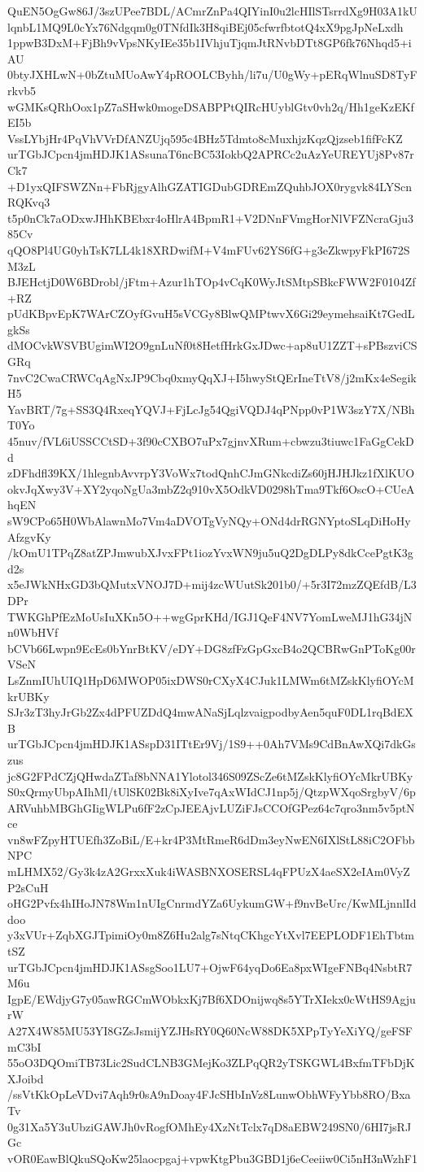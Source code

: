 QuEN5OgGw86J/3szUPee7BDL/ACmrZnPa4QIYinI0u2lcHIlSTsrrdXg9H03A1kU
lqnbL1MQ9L0cYx76Ndgqm0g0TNfdIk3H8qiBEj05cfwrfbtotQ4xX9pgJpNeLxdh
1ppwB3DxM+FjBh9vVpsNKyIEe35b1IVhjuTjqmJtRNvbDTt8GP6fk76Nhqd5+iAU
0btyJXHLwN+0bZtuMUoAwY4pROOLCByhh/li7u/U0gWy+pERqWlnuSD8TyFrkvb5
wGMKsQRhOox1pZ7aSHwk0mogeDSABPPtQIRcHUyblGtv0vh2q/Hh1geKzEKfEI5b
VssLYbjHr4PqVhVVrDfANZUjq595c4BHz5Tdmto8cMuxhjzKqzQjzseb1fifFcKZ
urTGbJCpcn4jmHDJK1ASsunaT6ncBC53IokbQ2APRCc2uAzYeUREYUj8Pv87rCk7
+D1yxQIFSWZNn+FbRjgyAlhGZATIGDubGDREmZQuhbJOX0rygvk84LYScnRQKvq3
t5p0nCk7aODxwJHhKBEbxr4oHlrA4BpmR1+V2DNnFVmgHorNlVFZNcraGju385Cv
qQO8Pl4UG0yhTsK7LL4k18XRDwifM+V4mFUv62YS6fG+g3eZkwpyFkPI672SM3zL
BJEHctjD0W6BDrobl/jFtm+Azur1hTOp4vCqK0WyJtSMtpSBkcFWW2F0104Zf+RZ
pUdKBpvEpK7WArCZOyfGvuH5sVCGy8BlwQMPtwvX6Gi29eymehsaiKt7GedLgkSs
dMOCvkWSVBUgimWI2O9gnLuNf0t8HetfHrkGxJDwc+ap8uU1ZZT+sPBszviCSGRq
7nvC2CwaCRWCqAgNxJP9Cbq0xmyQqXJ+I5hwyStQErIneTtV8/j2mKx4eSegikH5
YavBRT/7g+SS3Q4RxeqYQVJ+FjLcJg54QgiVQDJ4qPNpp0vP1W3szY7X/NBhT0Yo
45nuv/fVL6iUSSCCtSD+3f90cCXBO7uPx7gjnvXRum+cbwzu3tiuwc1FaGgCekDd
zDFhdfl39KX/1hlegnbAvvrpY3VoWx7todQnhCJmGNkcdiZs60jHJHJkz1fXlKUO
okvJqXwy3V+XY2yqoNgUa3mbZ2q910vX5OdkVD0298hTma9Tkf6OscO+CUeAhqEN
sW9CPo65H0WbAlawnMo7Vm4aDVOTgVyNQy+ONd4drRGNYptoSLqDiHoHyAfzgvKy
/kOmU1TPqZ8atZPJmwubXJvxFPt1iozYvxWN9ju5uQ2DgDLPy8dkCcePgtK3gd2s
x5eJWkNHxGD3bQMutxVNOJ7D+mij4zcWUutSk201b0/+5r3I72mzZQEfdB/L3DPr
TWKGhPfEzMoUsIuXKn5O++wgGprKHd/IGJ1QeF4NV7YomLweMJ1hG34jNn0WbHVf
bCVb66Lwpn9EcEs0bYnrBtKV/eDY+DG8zfFzGpGxcB4o2QCBRwGnPToKg00rVSeN
LsZnmIUhUIQ1HpD6MWOP05ixDWS0rCXyX4CJuk1LMWm6tMZskKlyfiOYcMkrUBKy
SJr3zT3hyJrGb2Zx4dPFUZDdQ4mwANaSjLqlzvaigpodbyAen5quF0DL1rqBdEXB
urTGbJCpcn4jmHDJK1ASspD31ITtEr9Vj/1S9++0Ah7VMs9CdBnAwXQi7dkGszus
jc8G2FPdCZjQHwdaZTaf8bNNA1Ylotol346S09ZScZe6tMZskKlyfiOYcMkrUBKy
S0xQrmyUbpAIhMl/tUlSK02Bk8iXyIve7qAxWIdCJ1np5j/QtzpWXqoSrgbyV/6p
ARVuhbMBGhGIigWLPu6fF2zCpJEEAjvLUZiFJsCCOfGPez64c7qro3nm5v5ptNce
vn8wFZpyHTUEfh3ZoBiL/E+kr4P3MtRmeR6dDm3eyNwEN6IXlStL88iC2OFbbNPC
mLHMX52/Gy3k4zA2GrxxXuk4iWASBNXOSERSL4qFPUzX4aeSX2eIAm0VyZP2sCuH
oHG2Pvfx4hIHoJN78Wm1nUIgCnrmdYZa6UykumGW+f9nvBeUrc/KwMLjnnlIddoo
y3xVUr+ZqbXGJTpimiOy0m8Z6Hu2alg7sNtqCKhgcYtXvl7EEPLODF1EhTbtmtSZ
urTGbJCpcn4jmHDJK1ASsgSoo1LU7+OjwF64yqDo6Ea8pxWIgeFNBq4NsbtR7M6u
IgpE/EWdjyG7y05awRGCmWObkxKj7Bf6XDOnijwq8s5YTrXIekx0cWtHS9AgjurW
A27X4W85MU53YI8GZsJsmijYZJHsRY0Q60NcW88DK5XPpTyYeXiYQ/geFSFmC3bI
55oO3DQOmiTB73Lic2SudCLNB3GMejKo3ZLPqQR2yTSKGWL4BxfmTFbDjKXJoibd
/ssVtKkOpLeVDvi7Aqh9r0sA9nDoay4FJcSHbInVz8LunwObhWFyYbb8RO/BxaTv
0g31Xa5Y3uUbziGAWJh0vRogfOMhEy4XzNtTclx7qD8aEBW249SN0/6HI7jsRJGc
vOR0EawBlQkuSQoKw25laocpgaj+vpwKtgPbu3GBD1j6eCeeiiw0Ci5nH3nWzhF1
